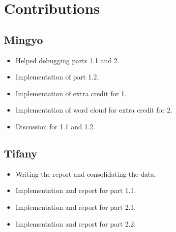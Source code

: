 \section{Contributions}
\begin{multicols*}{2}
\subsection{Mingyo}
\begin{itemize}
  \item Helped debugging parts 1.1 and 2.
  \item Implementation of part 1.2.
  \item Implementation of extra credit for 1.
  \item Implementation of word cloud for extra credit for 2.
  \item Discussion for 1.1 and 1.2.
\end{itemize}

\subsection{Tifany}
\begin{itemize}
  \item Writing the report and consolidating the data.
  \item Implementation and report for part 1.1.
  \item Implementation and report for part 2.1.
  \item Implementation and report for part 2.2.
\end{itemize}
\end{multicols*}